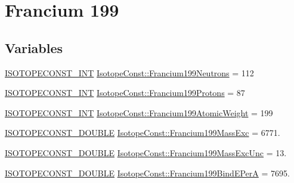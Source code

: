 \hypertarget{group___isotope_const-_francium-_fr199}{}\section{Francium 199}
\label{group___isotope_const-_francium-_fr199}
\subsection*{Variables}
\begin{DoxyCompactItemize}
\item 
\mbox{\hyperlink{group___isotope_const-_macros_ga5f18360b3e99483a35c32d789e62621c}{I\+S\+O\+T\+O\+P\+E\+C\+O\+N\+S\+T\+\_\+\+I\+NT}} \mbox{\hyperlink{group___isotope_const-_francium-_fr199_gabd18cf69b765074ac5819b617c16c11c}{Isotope\+Const\+::\+Francium199\+Neutrons}} = 112
\item 
\mbox{\hyperlink{group___isotope_const-_macros_ga5f18360b3e99483a35c32d789e62621c}{I\+S\+O\+T\+O\+P\+E\+C\+O\+N\+S\+T\+\_\+\+I\+NT}} \mbox{\hyperlink{group___isotope_const-_francium-_fr199_ga4aeabfd96fbace03c9863a8db08ba5ee}{Isotope\+Const\+::\+Francium199\+Protons}} = 87
\item 
\mbox{\hyperlink{group___isotope_const-_macros_ga5f18360b3e99483a35c32d789e62621c}{I\+S\+O\+T\+O\+P\+E\+C\+O\+N\+S\+T\+\_\+\+I\+NT}} \mbox{\hyperlink{group___isotope_const-_francium-_fr199_ga3d8084057412e9c7b46eff1a8275d99b}{Isotope\+Const\+::\+Francium199\+Atomic\+Weight}} = 199
\item 
\mbox{\hyperlink{group___isotope_const-_macros_ga8f45a7272ce02c0b4c65c44636ed719a}{I\+S\+O\+T\+O\+P\+E\+C\+O\+N\+S\+T\+\_\+\+D\+O\+U\+B\+LE}} \mbox{\hyperlink{group___isotope_const-_francium-_fr199_gadffa5894cf8dd599592cb959df470406}{Isotope\+Const\+::\+Francium199\+Mass\+Exc}} = 6771.
\item 
\mbox{\hyperlink{group___isotope_const-_macros_ga8f45a7272ce02c0b4c65c44636ed719a}{I\+S\+O\+T\+O\+P\+E\+C\+O\+N\+S\+T\+\_\+\+D\+O\+U\+B\+LE}} \mbox{\hyperlink{group___isotope_const-_francium-_fr199_ga109c3bdd76070ef47ecb995ee81571bf}{Isotope\+Const\+::\+Francium199\+Mass\+Exc\+Unc}} = 13.
\item 
\mbox{\hyperlink{group___isotope_const-_macros_ga8f45a7272ce02c0b4c65c44636ed719a}{I\+S\+O\+T\+O\+P\+E\+C\+O\+N\+S\+T\+\_\+\+D\+O\+U\+B\+LE}} \mbox{\hyperlink{group___isotope_const-_francium-_fr199_gab0c34e83ba8534ea38b1fd7a2009f442}{Isotope\+Const\+::\+Francium199\+Bind\+E\+PerA}} = 7695.
\item 

\end{DoxyCompactItemize}
